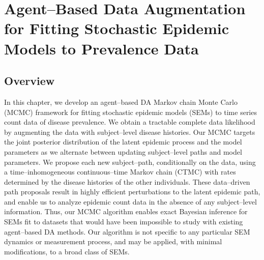 \chapter{Agent--Based Data Augmentation for Fitting Stochastic Epidemic Models to Prevalence Data}
\label{chap:bda_for_fitting_sems_to_prevalence_data}

\section{Overview}
\label{sec:bda_overview}


In this chapter, we develop an agent--based DA Markov chain Monte Carlo (MCMC) framework for fitting stochastic epidemic models (SEMs) to time series count data of disease prevalence. We obtain a tractable complete data likelihood by augmenting the data with subject--level disease histories. Our MCMC targets the joint posterior distribution of the latent epidemic process and the model parameters as we alternate between updating subject--level paths and model parameters. We propose each new subject--path, conditionally on the data, using a time--inhomogeneous continuous--time Markov chain (CTMC) with rates determined by the disease histories of the other individuals. These data--driven path proposals result in highly efficient perturbations to the latent epidemic path, and enable us to analyze epidemic count data in the absence of any subject--level information. Thus, our MCMC algorithm enables exact Bayesian inference for SEMs fit to datasets that would have been impossible to study with existing agent--based DA methods. Our algorithm is not specific to any particular SEM dynamics or measurement process, and may be applied, with minimal modifications, to a broad class of SEMs. 

